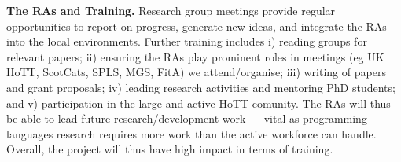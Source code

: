\documentclass[a4paper,11pt]{article}
\begin{document}
{\bf The RAs and Training.} Research group meetings provide regular opportunities to report on
progress, generate new ideas, and integrate the
RAs into the local environments. Further training includes i)
reading groups for relevant papers; ii) ensuring the RAs play
prominent roles in meetings (eg UK HoTT, ScotCats, SPLS, MGS, FitA) we
attend/organise; iii) writing of papers and grant proposals; iv)
leading research activities and mentoring PhD students; and v)
participation in the large and active HoTT comunity. The RAs
will thus be able to lead future research/development work
--- vital as  
programming languages research requires more work than the active workforce can
handle. Overall, the project will thus have high impact in terms
of training.







\begin{footnotesize}
\begin{multicols}{2}

%
%

\end{multicols}
\end{footnotesize}

% 
% 
\end{document}
